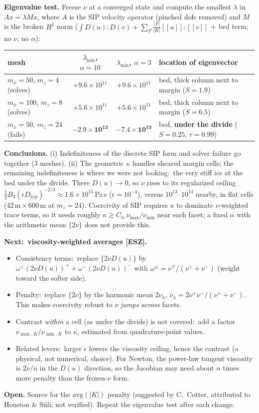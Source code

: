 \documentclass[10pt]{article}
\newcommand{\jump}[1]{[\![#1]\!]}
\newcommand{\avgb}[1]{\{#1\}}
\begin{document}
\textbf{Eigenvalue test.} Freeze $\nu$ at a converged state and compute the smallest $\lambda$ in $A x=\lambda M x$, where $A$ is the SIP velocity operator (pinched dofs removed) and $M$ is the broken $H^1$ norm ($\int D(u){:}D(v)+\sum_F\tfrac{|F|}{|K|}\jump{u}{:}\jump{v}$ + bed term; no $\nu$, no $\alpha$):
\begin{center}\small
\begin{tabular}{lccl}
\toprule
mesh & $\lambda_{\min}$, $\alpha=10$ & $\lambda_{\min}$, $\alpha=3$ & location of eigenvector \\
\midrule
$m_x=50$, $m_z=4$ (solves) & $+9.6\times10^{11}$ & $+9.6\times10^{11}$ & bed, thick column next to margin ($S=1.9$)\\
$m_x=100$, $m_z=8$ (solves) & $+5.6\times10^{11}$ & $+5.6\times10^{11}$ & bed, thick column next to margin ($S=6.5$)\\
$m_x=50$, $m_z=24$ (fails) & $\mathbf{-2.9\times10^{13}}$ & $\mathbf{-7.4\times10^{13}}$ & bed, \textbf{under the divide} ($S=0.25$, $\tau=0.99$)\\
\bottomrule
\end{tabular}
\end{center}
\textbf{Conclusions.} (i) Indefiniteness of the discrete SIP form and solver failure go together (3 meshes). (ii) The geometric $\kappa$ handles sheared margin cells; the remaining indefiniteness is where we were not looking:\ the very stiff ice at the bed under the divide. There $D(u)\to0$, so $\nu$ rises to its regularized ceiling $\tfrac12 B_3(\epsilon D_{\text{typ}})^{-2/3}\approx1.6\times10^{15}$\,Pa\,s ($\epsilon=10^{-4}$), versus $10^{13}$--$10^{14}$ nearby, in flat cells (42\,m\,$\times$\,600\,m at $m_z=24$). Coercivity of SIP requires $\kappa$ to dominate $\nu$-weighted trace terms, so it needs roughly $\kappa\gtrsim C_{tr}\,\nu_{\max}/\nu_{\min}$ near each facet; a fixed $\alpha$ with the arithmetic mean $\avgb{2\nu}$ does not provide this.

\textbf{Next:\ viscosity-weighted averages [ESZ].}
\begin{itemize}
\item Consistency terms:\ replace $\avgb{2\nu D(u)}$ by $\omega^+(2\nu D(u))^+ + \omega^-(2\nu D(u))^-$ with $\omega^\pm=\nu^\mp/(\nu^++\nu^-)$ (weight toward the softer side).
\item Penalty:\ replace $\avgb{2\nu}$ by the harmonic mean $2\nu_h$, $\nu_h=2\nu^+\nu^-/(\nu^++\nu^-)$. This makes coercivity robust to $\nu$ \emph{jumps across} facets.
\item Contrast \emph{within} a cell (as under the divide) is not covered:\ add a factor $\nu_{\max,K}/\nu_{\min,K}$ to $\kappa$, estimated from quadrature-point values.
\item Related levers:\ larger $\epsilon$ lowers the viscosity ceiling, hence the contrast (a physical, not numerical, choice). For Newton, the power-law tangent viscosity is $2\nu/n$ in the $D(u)$ direction, so the Jacobian may need about $n$ times more penalty than the frozen-$\nu$ form.
\end{itemize}
\textbf{Open.} Source for the $\mathrm{avg}(|K|)$ penalty (suggested by C.\ Cotter, attributed to Houston \& S\"uli; not verified). Repeat the eigenvalue test after each change.
\end{document}
